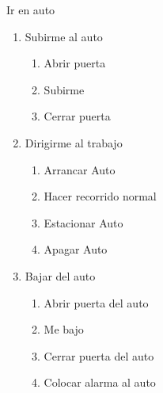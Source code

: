 \item Ir en auto %
  \begin{enumerate}
  \def\labelenumi{\arabic{enumi}.}
  \tightlist
  \item Subirme al auto %
      \begin{enumerate}
      \def\labelenumi{\arabic{enumi}.}
      \tightlist
      \item Abrir puerta 
      \item Subirme 
      \item  Cerrar puerta 
      \end{enumerate}
  \item Dirigirme al trabajo %
    \begin{enumerate}
    \def\labelenumii{\arabic{enumii}.}
    \tightlist
    \item Arrancar Auto
    \item Hacer recorrido normal
    \item Estacionar Auto
    \item Apagar Auto
    \end{enumerate}
  \item Bajar del auto
    \begin{enumerate}
    \def\labelenumii{\arabic{enumii}.}
    \tightlist
    \item Abrir puerta del auto
    \item Me bajo
    \item Cerrar puerta del auto
    \item
      Colocar alarma al auto
  \end{enumerate}
\end{enumerate}